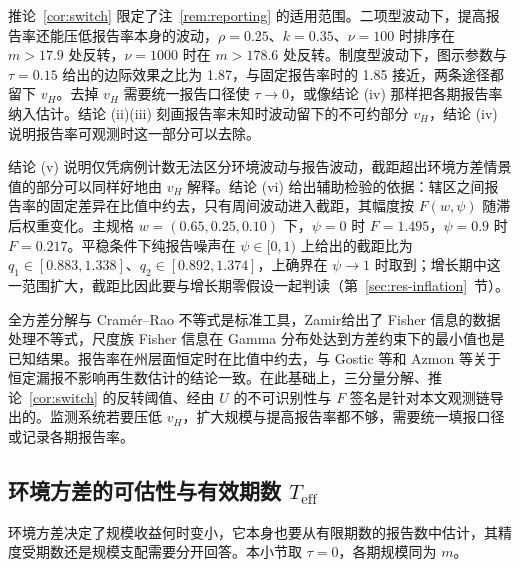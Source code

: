 推论~\ref{cor:switch} 限定了注~\ref{rem:reporting} 的适用范围。二项型波动下，提高报告率还能压低报告率本身的波动，$\rho=0.25$、$k=0.35$、$\nu=100$ 时排序在 $m>17.9$ 处反转，$\nu=1000$ 时在 $m>178.6$ 处反转。制度型波动下，图示参数与 $\tau=0.15$ 给出的边际效果之比为 1.87，与固定报告率时的 1.85 接近，两条途径都留下 $v_H$。去掉 $v_H$ 需要统一报告口径使 $\tau\to0$，或像结论 (iv) 那样把各期报告率纳入估计。结论 (ii)(iii) 刻画报告率未知时波动留下的不可约部分 $v_H$，结论 (iv) 说明报告率可观测时这一部分可以去除。

结论 (v) 说明仅凭病例计数无法区分环境波动与报告波动，截距超出环境方差情景值的部分可以同样好地由 $v_H$ 解释。结论 (vi) 给出辅助检验的依据：辖区之间报告率的固定差异在比值中约去，只有周间波动进入截距，其幅度按 $F(w,\psi)$ 随滞后权重变化。主规格 $w=(0.65,0.25,0.10)$ 下，$\psi=0$ 时 $F=1.495$，$\psi=0.9$ 时 $F=0.217$。平稳条件下纯报告噪声在 $\psi\in[0,1)$ 上给出的截距比为 $q_1\in[0.883,1.338]$、$q_2\in[0.892,1.374]$，上确界在 $\psi\to1$ 时取到；增长期中这一范围扩大，截距比因此要与增长期零假设一起判读（第~\ref{sec:res-inflation}~节）。

全方差分解与 Cramér--Rao 不等式是标准工具\citep{casella2002statistical}，Zamir\citep{zamir1998proof}给出了 Fisher 信息的数据处理不等式，尺度族 Fisher 信息在 Gamma 分布处达到方差约束下的最小值也是已知结果\citep{lehmann1998point}。报告率在州层面恒定时在比值中约去，与 Gostic 等\citep{gostic2020practical}和 Azmon 等\citep{azmon2014estimating}关于恒定漏报不影响再生数估计的结论一致。在此基础上，三分量分解、推论~\ref{cor:switch} 的反转阈值、经由 $U$ 的不可识别性与 $F$ 签名是针对本文观测链导出的。监测系统若要压低 $v_H$，扩大规模与提高报告率都不够，需要统一填报口径或记录各期报告率。

\subsection{环境方差的可估性与有效期数 \texorpdfstring{$T_{\mathrm{eff}}$}{T\_eff}}
\label{sec:r3-vR}

环境方差决定了规模收益何时变小，它本身也要从有限期数的报告数中估计，其精度受期数还是规模支配需要分开回答。本小节取 $\tau=0$，各期规模同为 $m$。

